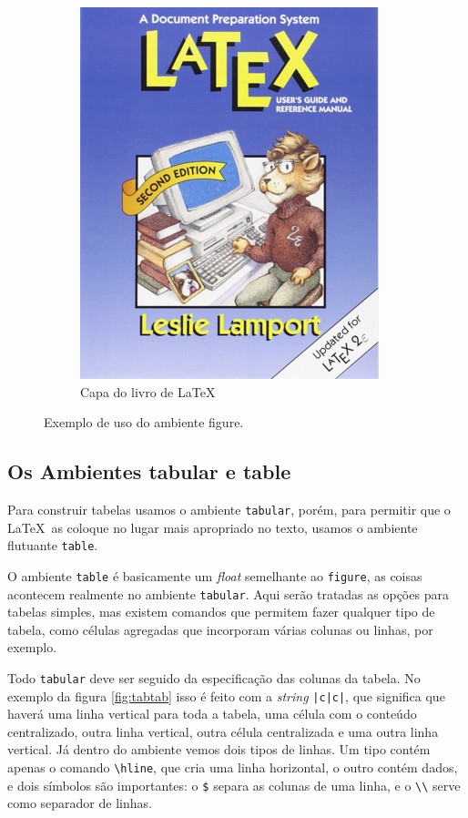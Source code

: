 \begin{figure}
    \begin{LTXexample}[pos=b]
\begin{figure}[htb]
\centering
\includegraphics[height=0.3\textheight]{Images/Picture6}
\caption{Capa do livro de \LaTeX\ }
\label{fig:picture6}
\end{figure}
    \end{LTXexample}
    \caption{Exemplo de uso do ambiente figure.}
    \label{fig:fig}
\end{figure}

\subsection{Os Ambientes tabular e table}

Para construir tabelas usamos o ambiente \lstinline|tabular|, porém, para permitir que o \LaTeX\ as coloque no lugar mais apropriado no texto, usamos o ambiente flutuante \lstinline|table|.

O ambiente \lstinline|table| é basicamente um \textit{float} semelhante ao \lstinline|figure|, as coisas acontecem realmente no ambiente \lstinline|tabular|. Aqui serão tratadas as opções para tabelas simples, mas existem comandos que permitem fazer qualquer tipo de tabela, como células agregadas que incorporam várias colunas ou linhas, por exemplo.

Todo \lstinline|tabular| deve ser seguido da especificação das colunas da tabela.
No exemplo da figura \ref{fig:tabtab} isso é feito com a \textit{string} \lstinline/|c|c|/,
que significa que haverá uma linha vertical para toda  a tabela, uma célula com o conteúdo centralizado, outra linha vertical, outra célula centralizada e uma outra linha vertical. 
Já dentro do ambiente vemos dois tipos de linhas. 
Um tipo contém apenas o comando \lstinline|\hline|, que cria uma linha horizontal, o outro contém dados, e dois símbolos são importantes: o \lstinline|$| separa as colunas de uma linha, e o \lstinline|\\| serve como separador de linhas.

